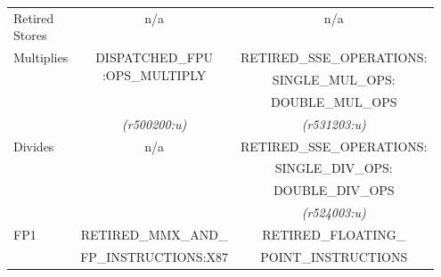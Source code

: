 \begin{tabular}{|l||c|c|}
\hline
\multirow{3}{*}{\parbox{0.5in}{Retired \\Stores}}              &  
\multirow{3}{*}{n/a}      & %
\multirow{3}{*}{n/a}     \\ %

                          &
                          & %
                         \\ %

                          &
                          & %
                         \\ %

\hline
\multirow{4}{*}{\parbox{0.5in}{Multiplies}}                 &  
\multirow{3}{*}{\parbox{1in}{\centering DISPATCHED\_FPU\\
:OPS\_MULTIPLY}}        & %
RETIRED\_SSE\_OPERATIONS: \\ %


                      &
                      & %
SINGLE\_MUL\_OPS:     \\ %

                      &
                      & %
DOUBLE\_MUL\_OPS     \\ %

                      &
{\em (r500200:u)}     & %
{\em (r531203:u)}    \\ %


\hline
\multirow{4}{*}{\parbox{0.5in}{Divides}} &
\multirow{4}{*}{n/a}    & %
RETIRED\_SSE\_OPERATIONS: \\ %

                      &
                      & %
SINGLE\_DIV\_OPS:     \\ %

                      &
                      & %
DOUBLE\_DIV\_OPS     \\ %

                      &
                      & %
{\em (r524003:u)}    \\ %


\hline
\multirow{3}{*}{\parbox{0.5in}{FP1}}  &
RETIRED\_MMX\_AND\_       & %
RETIRED\_FLOATING\_      \\ %

                        &
FP\_INSTRUCTIONS:X87    & %
POINT\_INSTRUCTIONS    \\ %



\end{tabular}
